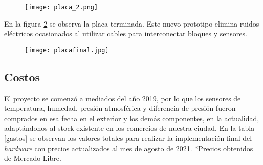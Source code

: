 \begin{figure}[H]
	\centering
	\texttt{[image: placa\_2.png]}
	\label{fig:hardBloq}
\end{figure}

En la figura \ref{fig:placafinal} se observa la placa terminada. Este nuevo prototipo elimina ruidos eléctricos ocasionados al utilizar cables para interconectar bloques y sensores.

\begin{figure}[H]
	\centering
	\texttt{[image: placafinal.jpg]}
	\label{fig:placafinal}
\end{figure}





\subsection{Costos}
El proyecto se comenzó a mediados del año 2019, por lo que los sensores de temperatura, humedad, 
presión atmosférica y diferencia de presión fueron comprados en esa fecha en el exterior y los demás componentes, en la actualidad, adaptándonos al stock existente en los comercios de nuestra ciudad. En la tabla \ref{gastos} se observan los valores totales para realizar la implementación final del \textit{hardware} con precios actualizados al mes de agosto de 2021. *Precios obtenidos de Mercado Libre.


